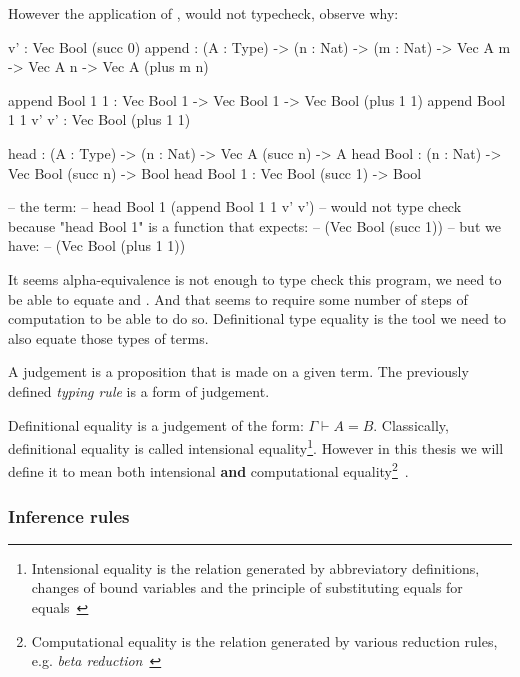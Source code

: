 However the application of , would not typecheck, observe why:

\begin{piforall}
       v' : Vec Bool (succ 0)
       append : (A : Type) -> (n : Nat) -> (m : Nat) -> Vec A m -> Vec A n -> Vec A (plus m n)

       append Bool 1 1 : Vec Bool 1 -> Vec Bool 1 -> Vec Bool (plus 1 1)
       append Bool 1 1 v' v' : Vec Bool (plus 1 1)

       head : (A : Type) -> (n : Nat) -> Vec A (succ n) -> A
       head Bool : (n : Nat) -> Vec Bool (succ n) -> Bool
       head Bool 1 : Vec Bool (succ 1) -> Bool

       -- the term:
       --   head Bool 1 (append Bool 1 1 v' v')
       -- would not type check because "head Bool 1" is a function that expects:
       --   (Vec Bool (succ 1))
       -- but we have:
       --   (Vec Bool (plus 1 1))
\end{piforall}

It seems alpha-equivalence is not enough to type check this program, we need to be able to equate  and . And that seems to require some number of steps of computation to be able to do so.
Definitional type equality is the tool we need to also equate those types of terms.

\begin{definition}[Judgement]
       A judgement is a proposition that is made on a given term. The previously defined \emph{typing rule} is a form of judgement.\cite{nlab:judgment}
\end{definition}

\begin{definition}
       Definitional equality is a judgement of the form: $\Gamma \vdash A = B$.
       Classically, definitional equality is called intensional equality\footnote{Intensional equality is the relation generated by abbreviatory definitions, changes of bound variables and the principle of substituting equals for equals~\cite{nlab:equality}}. However in this thesis we will define it to mean both intensional \textbf{and} computational equality\footnote{Computational equality is the relation generated by various reduction rules, e.g. \emph{beta reduction}~\cite{nlab:equality}}~\cite{nlab:equality}.
\end{definition}

\subsubsection{Inference rules}

